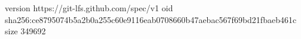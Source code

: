 version https://git-lfs.github.com/spec/v1
oid sha256:ce8795074b5a2b0a255c60e9116eab0708660b47aebac567f69bd21fbaeb461c
size 349692
